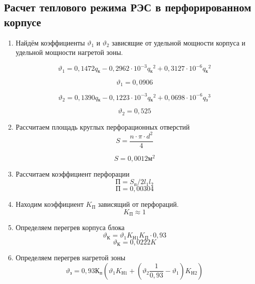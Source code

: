 \subsection{Расчет теплового режима РЭС в перфорированном корпусе}
\begin{enumerate}[label={\arabic*.}]

\item Найдём коэффициенты
$\vartheta_1$ и $\vartheta_2$ зависящие
от удельной мощности корпуса и удельной мощности нагретой зоны.

\begin{equation}
\vartheta_1 = 0,1472q\mathrm{_к} - 0,2962 \cdot 10^{-3}q\mathrm{_к}^2 + 0,3127 \cdot 10^{-6}q\mathrm{_к}^2
\end{equation}

$$\vartheta_1=0,0906$$

\begin{equation}
\vartheta_2 = 0,1390q\mathrm{_к} - 0,1223 \cdot 10^{-3}q\mathrm{_к}^2 + 0,0698 \cdot 10^{-6}q\mathrm{_з}^3
\end{equation}

$$\vartheta_2 = 0,525$$

\item Рассчитаем площадь круглых перфорационных отверстий
  \begin{equation}
    S = \frac{n \cdot \pi \cdot d^2}{4}
  \end{equation}

  $$S=0,0012\mathrm{м^2}$$



\item Рассчитаем коэффициент перфорации
  \begin{equation}
    \mathrm{П} = S\mathrm{_п}/2 l_1 l_2
  \end{equation}
  $$\mathrm{П} = 0,00304$$

\item Находим коэффициент $K\mathrm{_П}$ зависящий от перфораций.
  $$K\mathrm{_П} \approx 1$$

\item Определяем перегрев корпуса блока
  \begin{equation}
    \vartheta\mathrm{_К} = \vartheta_1K\mathrm{_{Н1}}K\mathrm{_П} \cdot 0,93
  \end{equation}
  $$\vartheta\mathrm{_К} =0,0222K$$
\item Определяем перегрев нагретой зоны
  \begin{equation}
\vartheta\mathrm{_з} = 0,93К\mathrm{_п}(\vartheta_1K\mathrm{_{Н1}} + (\vartheta_2\frac{1}{0,93} - \vartheta_1)K\mathrm{_{Н2}})
  \end{equation}


\end{enumerate}
